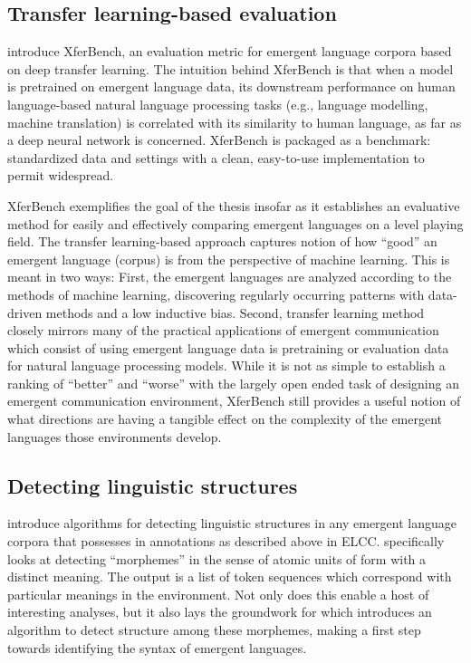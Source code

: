 \subsection{Transfer learning-based evaluation}

 introduce XferBench, an evaluation metric for emergent language corpora based on deep transfer learning.
The intuition behind XferBench is that when a model is pretrained on emergent language data, its downstream performance on human language-based natural language processing tasks (e.g., language modelling, machine translation) is correlated with its similarity to human language, as far as a deep neural network is concerned.
XferBench is packaged as a benchmark: standardized data and settings with a clean, easy-to-use implementation to permit widespread.

XferBench exemplifies the goal of the thesis insofar as it establishes an evaluative method for easily and effectively comparing emergent languages on a level playing field.
The transfer learning-based approach captures notion of how ``good'' an emergent language (corpus) is from the perspective of machine learning.
This is meant in two ways:
  First, the emergent languages are analyzed according to the methods of machine learning, discovering regularly occurring patterns with data-driven methods and a low inductive bias.
  Second, transfer learning method closely mirrors many of the practical applications of emergent communication which consist of using emergent language data is pretraining or evaluation data for natural language processing models.
While it is not as simple to establish a ranking of ``better'' and ``worse'' with the largely open ended task of designing an emergent communication environment, XferBench still provides a useful notion of what directions are having a tangible effect on the complexity of the emergent languages those environments develop.


\subsection{Detecting linguistic structures}

 introduce algorithms for detecting linguistic structures in any emergent language corpora that possesses in annotations as described above in ELCC.\@
{} specifically looks at detecting ``morphemes'' in the sense of atomic units of form with a distinct meaning.
The output is a list of token sequences which correspond with particular meanings in the environment.
Not only does this enable a host of interesting analyses, but it also lays the groundwork for  which introduces an algorithm to detect structure among these morphemes, making a first step towards identifying the syntax of emergent languages.

